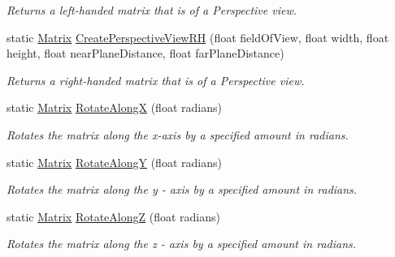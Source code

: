 \begin{DoxyCompactItemize}
\begin{DoxyCompactList}\small\item\em Returns a left-\/handed matrix that is of a Perspective view. \end{DoxyCompactList}\item 
\hypertarget{struct_jade_1_1_math_1_1_matrix_a8b992f7afc4cb247e128f0c663f88c58}{}static \hyperlink{struct_jade_1_1_math_1_1_matrix}{Matrix} \hyperlink{struct_jade_1_1_math_1_1_matrix_a8b992f7afc4cb247e128f0c663f88c58}{Create\+Perspective\+View\+R\+H} (float field\+Of\+View, float width, float height, float near\+Plane\+Distance, float far\+Plane\+Distance)\label{struct_jade_1_1_math_1_1_matrix_a8b992f7afc4cb247e128f0c663f88c58}

\begin{DoxyCompactList}\small\item\em Returns a right-\/handed matrix that is of a Perspective view. \end{DoxyCompactList}\item 
\hypertarget{struct_jade_1_1_math_1_1_matrix_abcab7ae42a87d52a30e33e9c0ffc271a}{}static \hyperlink{struct_jade_1_1_math_1_1_matrix}{Matrix} \hyperlink{struct_jade_1_1_math_1_1_matrix_abcab7ae42a87d52a30e33e9c0ffc271a}{Rotate\+Along\+X} (float radians)\label{struct_jade_1_1_math_1_1_matrix_abcab7ae42a87d52a30e33e9c0ffc271a}

\begin{DoxyCompactList}\small\item\em Rotates the matrix along the x-\/axis by a specified amount in radians. \end{DoxyCompactList}\item 
\hypertarget{struct_jade_1_1_math_1_1_matrix_a9293592908c57a2a4ffa3a725303cf4c}{}static \hyperlink{struct_jade_1_1_math_1_1_matrix}{Matrix} \hyperlink{struct_jade_1_1_math_1_1_matrix_a9293592908c57a2a4ffa3a725303cf4c}{Rotate\+Along\+Y} (float radians)\label{struct_jade_1_1_math_1_1_matrix_a9293592908c57a2a4ffa3a725303cf4c}

\begin{DoxyCompactList}\small\item\em Rotates the matrix along the y -\/ axis by a specified amount in radians. \end{DoxyCompactList}\item 
\hypertarget{struct_jade_1_1_math_1_1_matrix_ab492733f7eebfed5697163f2b9687bf5}{}static \hyperlink{struct_jade_1_1_math_1_1_matrix}{Matrix} \hyperlink{struct_jade_1_1_math_1_1_matrix_ab492733f7eebfed5697163f2b9687bf5}{Rotate\+Along\+Z} (float radians)\label{struct_jade_1_1_math_1_1_matrix_ab492733f7eebfed5697163f2b9687bf5}

\begin{DoxyCompactList}\small\item\em Rotates the matrix along the z -\/ axis by a specified amount in radians. \end{DoxyCompactList}\end{DoxyCompactItemize}
